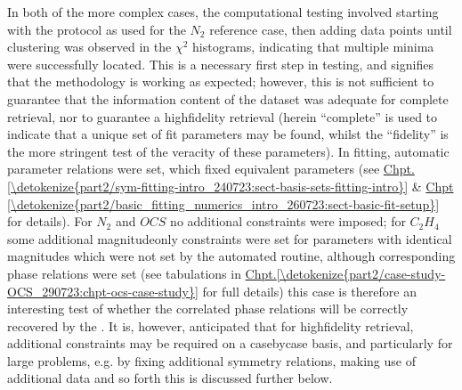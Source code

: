 \documentclass[letterpaper,table,10pt,english]{jupyterBook}
\begin{document}
\sphinxAtStartPar
In both of the more complex cases, the computational testing involved starting with the protocol as used for the \(N_2\) reference case, then adding data points until clustering was observed in the \(\chi^2\) histograms, indicating that multiple minima were successfully located. This is a necessary first step in testing, and signifies that the methodology is working as expected; however, this is not sufficient to guarantee that the information content of the dataset was adequate for complete {\hyperref[\detokenize{backmatter/glossary:term-radial-matrix-elements}]{}} retrieval, nor to guarantee a high\sphinxhyphen{}fidelity retrieval (herein “complete” is used to indicate that a unique set of fit parameters may be found, whilst the “fidelity” is the more stringent test of the veracity of these parameters). In fitting, automatic parameter relations were set, which fixed equivalent parameters (see \hyperref[\detokenize{part2/sym-fitting-intro_240723:sect-basis-sets-fitting-intro}]{Chpt.\@ \ref{\detokenize{part2/sym-fitting-intro_240723:sect-basis-sets-fitting-intro}}} \& \hyperref[\detokenize{part2/basic_fitting_numerics_intro_260723:sect-basic-fit-setup}]{Chpt \ref{\detokenize{part2/basic_fitting_numerics_intro_260723:sect-basic-fit-setup}}} for details). For \(N_2\) and \(OCS\) no additional constraints were imposed; for \(C_2H_4\) some additional magnitude\sphinxhyphen{}only constraints were set for parameters with identical magnitudes which were not set by the automated routine, although corresponding phase relations were  set (see tabulations in \hyperref[\detokenize{part2/case-study-OCS_290723:chpt-ocs-case-study}]{Chpt.\@ \ref{\detokenize{part2/case-study-OCS_290723:chpt-ocs-case-study}}} for full details) \sphinxhyphen{} this case is therefore an interesting test of whether the correlated phase relations will be correctly recovered by the {\hyperref[\detokenize{backmatter/glossary:term-bootstrap-retrieval-protocol}]{}}. It is, however, anticipated that for high\sphinxhyphen{}fidelity retrieval, additional constraints may be required on a case\sphinxhyphen{}by\sphinxhyphen{}case basis, and particularly for large problems, e.g. by fixing additional symmetry relations, making use of additional data and so forth \sphinxhyphen{} this is discussed further below.
\end{document}
